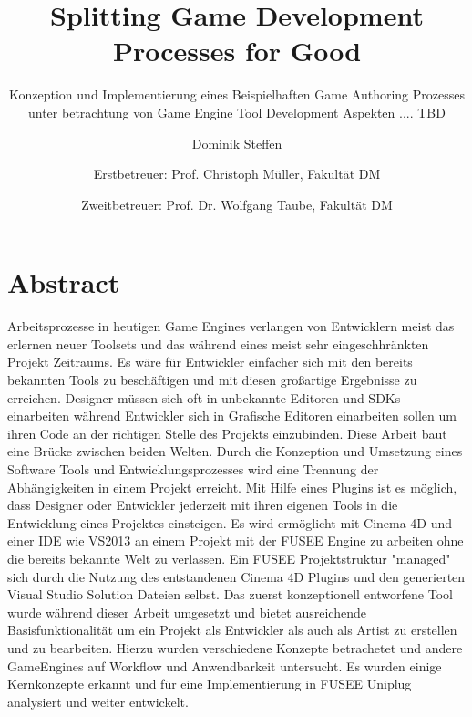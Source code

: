 \documentclass[pagesize, paper=a4, fontsize=12pt,titlepage=true, headings=small, headnosepline, abstractoff, liststotoc, nochapterprefix, plainheadsepline, twoside]{scrreprt}
\author{
Dominik Steffen \and
Erstbetreuer: Prof. Christoph Müller, Fakultät DM \and
Zweitbetreuer: Prof. Dr. Wolfgang Taube, Fakultät DM
}
\title{Splitting Game Development Processes for Good}
\subtitle{Konzeption und Implementierung eines Beispielhaften Game Authoring Prozesses unter betrachtung von Game Engine Tool Development Aspekten .... TBD}
\begin{document}



\newpage
\thispagestyle{empty}
\mbox{}

\begingroup
\newpage
\pagestyle{empty}
\renewcommand*{\chapterpagestyle}{empty}
\chapter*{Abstract}%
Arbeitsprozesse in heutigen Game Engines verlangen von Entwicklern meist das erlernen neuer Toolsets und das während eines meist sehr eingeschhränkten Projekt Zeitraums. Es wäre für Entwickler einfacher sich mit den bereits bekannten Tools zu beschäftigen und mit diesen großartige Ergebnisse zu erreichen. Designer müssen sich oft in unbekannte Editoren und SDKs einarbeiten während Entwickler sich in Grafische Editoren einarbeiten sollen um ihren Code an der richtigen Stelle des Projekts einzubinden.
Diese Arbeit baut eine Brücke zwischen beiden Welten. Durch die Konzeption und Umsetzung eines Software Tools und Entwicklungsprozesses wird eine Trennung der Abhängigkeiten in einem Projekt erreicht. Mit Hilfe eines Plugins ist es möglich, dass Designer oder Entwickler jederzeit mit ihren eigenen Tools in die Entwicklung eines Projektes einsteigen. Es wird ermöglicht mit Cinema 4D und einer IDE wie VS2013 an einem Projekt mit der FUSEE Engine zu arbeiten ohne die bereits bekannte Welt zu verlassen. Ein FUSEE Projektstruktur "managed" sich durch die Nutzung des entstandenen Cinema 4D Plugins und den generierten Visual Studio Solution Dateien selbst.
Das zuerst konzeptionell entworfene Tool wurde während dieser Arbeit umgesetzt und bietet ausreichende Basisfunktionalität um ein Projekt als Entwickler als auch als Artist zu erstellen und zu bearbeiten. Hierzu wurden verschiedene Konzepte betrachetet und andere GameEngines auf Workflow und Anwendbarkeit untersucht. Es wurden einige Kernkonzepte erkannt und für eine Implementierung in FUSEE Uniplug analysiert und weiter entwickelt.
\clearpage
\endgroup
\end{document}
